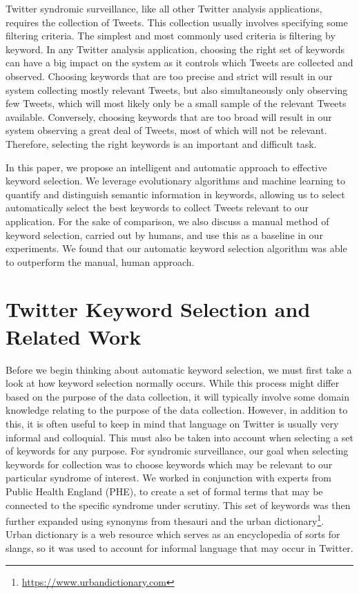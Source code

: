 \documentclass[runningheads]{llncs}
\begin{document}
Twitter syndromic surveillance, like all other Twitter analysis applications, requires the collection of Tweets. This collection usually involves specifying some filtering criteria. The simplest and most commonly used criteria is filtering by keyword. In any Twitter analysis application, choosing the right set of keywords can have a big impact on the system as it controls which Tweets are collected and observed. Choosing keywords that are too precise and strict will result in our system collecting mostly relevant Tweets, but also simultaneously only observing few Tweets, which will most likely only be a small sample of the relevant Tweets available. Conversely, choosing keywords that are too broad will result in our system observing a great deal of Tweets, most of which will not be relevant. Therefore, selecting the right keywords is an important and difficult task. 

In this paper, we propose an intelligent and automatic approach to effective keyword selection. We leverage evolutionary algorithms and machine learning to quantify and distinguish semantic information in keywords, allowing us to select automatically select the best keywords to collect Tweets relevant to our application. For the sake of comparison, we also discuss a manual method of keyword selection, carried out by humans, and use this as a baseline in our experiments. We found that our automatic keyword selection algorithm was able to outperform the manual, human approach.


\section{Twitter Keyword Selection and Related Work}\label{keyword-selection}
Before we begin thinking about automatic keyword selection, we must first take a look at how keyword selection normally occurs. While this process might differ based on the purpose of the data collection, it will typically involve some domain knowledge relating to the purpose of the data collection. However, in addition to this, it is often useful to keep in mind that language on Twitter is usually very informal and colloquial. This must also be taken into account when selecting a set of keywords for any purpose. For syndromic surveillance, our goal when selecting keywords for collection was to choose keywords which may be relevant to our particular syndrome of interest. We worked in conjunction with experts from Public Health England (PHE), to create a set of formal terms that may be connected to the specific syndrome under scrutiny. This set of keywords was then further expanded using synonyms from thesauri and the urban dictionary\footnote{\url{https://www.urbandictionary.com}}. Urban dictionary is a web resource which serves as an encyclopedia of sorts for slangs, so it was used to account for informal language that may occur in Twitter.  
\end{document}
